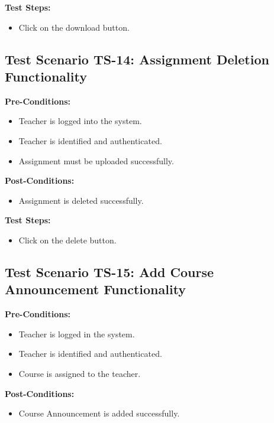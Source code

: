 \textbf{Test Steps:}
\begin{itemize}

\item Click on the download button.

\end{itemize}

\subsection{Test Scenario TS-14: Assignment Deletion Functionality}
\textbf{Pre-Conditions: }
\begin{itemize}

\item Teacher is logged into the system.
\item Teacher is identified and authenticated.
\item Assignment must be uploaded successfully.

\end{itemize}
\textbf{Post-Conditions: }
\begin{itemize}
\item Assignment is deleted successfully.
\end{itemize}

\textbf{Test Steps:}
\begin{itemize}

\item Click on the delete button.

\end{itemize}






\subsection{Test Scenario TS-15: Add Course Announcement Functionality}
\textbf{Pre-Conditions: }
\begin{itemize}

\item Teacher is logged in the system.
\item Teacher is identified and authenticated.
\item Course is assigned to the teacher.

\end{itemize}

\textbf{Post-Conditions: }
\begin{itemize}

\item Course Announcement is added successfully.

\end{itemize}


